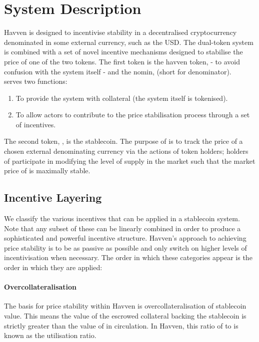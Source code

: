 \section{System Description} Havven is designed to incentivise stability in a decentralised cryptocurrency denominated in some external currency, such as the USD. The dual-token system is combined with a set of novel incentive mechanisms designed to stabilise the price of one of the two tokens. The first token is the havven token, \HAV{} - to avoid confusion with the system itself - and the nomin, \NOM{} (short for denominator). \\

\noindent \HAV{} serves two functions:

\begin{enumerate}
\item{To provide the system with collateral (the system itself is tokenised).}
\item{To allow actors to contribute to the price stabilisation process through a set of incentives.}
\end{enumerate}

\noindent The second token, \NOM{}, is the stablecoin. The purpose of \NOM{} is to track the price of a chosen external denominating currency via the actions of \HAV{} token holders; holders of \HAV{} participate in modifying the level of supply in the \NOM{} market such that the market price of \NOM{} is maximally stable.

\subsection{Incentive Layering}

We classify the various incentives that can be applied in a stablecoin system. Note that any subset of these can be linearly combined in order to produce a sophisticated and powerful incentive structure. Havven's approach to achieving price stability is to be as passive as possible and only switch on higher levels of incentivisation when necessary. The order in which these categories appear is the order in which they are applied:

\paragraph{Overcollateralisation}

The basis for price stability within Havven is overcollateralisation of stablecoin value. This means the value of the escrowed collateral backing the stablecoin is strictly greater than the value of \NOM{} in circulation. In Havven, this ratio of \NOM{} to \HAV{} is known as the utilisation ratio.

